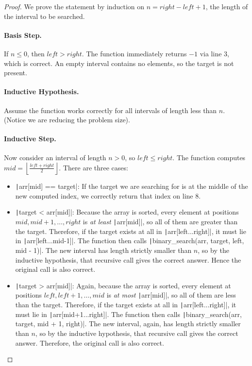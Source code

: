 \begin{proof}

    We prove the statement by induction on $n = right - left + 1$, the length of the interval to be searched.

    \paragraph{Basis Step.}
    If $n\le0$, then $left > right$. The function immediately returns $-1$ via line $3$, which is correct. An empty interval contains no elements, so the target is not present.
    \paragraph{Inductive Hypothesis.}
    Assume the function works correctly for all intervals of length less than $n$. (Notice we are reducing the problem size).
    \paragraph{Inductive Step.}
    Now consider an interval of length $n > 0$, so $left \le right$. The function computes $mid = \left\lfloor \frac{left + right}{2} \right\rfloor$. There are three cases:
    \begin{itemize}
        \item \texttt|arr[mid] == target|: If the target we are searching for is at the middle of the new computed index, we correctly return that index on line $8$.
        \item \texttt|target < arr[mid]|: Because the array is sorted, every element at positions $mid, mid+1, \dots, right$ is \emph{at least} \texttt|arr[mid]|, so all of them are greater than the target. Therefore, if the target exists at all in \texttt|arr[left...right]|, it must lie in \texttt|arr[left...mid-1]|. The function then calls \texttt|binary_search(arr, target, left, mid - 1)|. The new interval has length strictly smaller than $n$, so by the inductive hypothesis, that recursive call gives the correct answer. Hence the original call is also correct.
        
        \item \texttt|target > arr[mid]|: Again, because the array is sorted, every element at positions $left, left+1, \dots, mid$ is \emph{at most} \texttt|arr[mid]|, so all of them are less than the target. Therefore, if the target exists at all in \texttt|arr[left...right]|, it must lie in \texttt|arr[mid+1...right]|. The function then calls \texttt|binary_search(arr, target, mid + 1, right)|. The new interval, again, has length strictly smaller than $n$, so by the inductive hypothesis, that recursive call gives the correct answer. Therefore, the original call is also correct.
    \end{itemize}

\end{proof}
